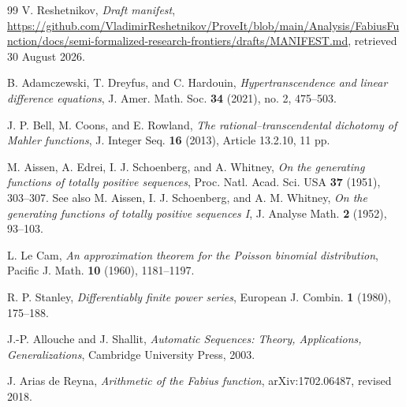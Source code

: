 \documentclass[11pt,oneside]{article}
\theoremstyle{definition}
\theoremstyle{remark}
\begin{document}
\begin{thebibliography}{99}
V. Reshetnikov,
\emph{Draft manifest},
\url{https://github.com/VladimirReshetnikov/ProveIt/blob/main/Analysis/FabiusFunction/docs/semi-formalized-research-frontiers/drafts/MANIFEST.md},
retrieved 30 August 2026.

B. Adamczewski, T. Dreyfus, and C. Hardouin,
\emph{Hypertranscendence and linear difference equations},
J. Amer. Math. Soc. \textbf{34} (2021), no. 2, 475--503.

J. P. Bell, M. Coons, and E. Rowland,
\emph{The rational--transcendental dichotomy of Mahler functions},
J. Integer Seq. \textbf{16} (2013), Article 13.2.10, 11 pp.

M. Aissen, A. Edrei, I. J. Schoenberg, and A. Whitney,
\emph{On the generating functions of totally positive sequences},
Proc. Natl. Acad. Sci. USA \textbf{37} (1951), 303--307.
See also M. Aissen, I. J. Schoenberg, and A. M. Whitney,
\emph{On the generating functions of totally positive sequences I},
J. Analyse Math. \textbf{2} (1952), 93--103.

L. Le Cam,
\emph{An approximation theorem for the Poisson binomial distribution},
Pacific J. Math. \textbf{10} (1960), 1181--1197.

R. P. Stanley,
\emph{Differentiably finite power series},
European J. Combin. \textbf{1} (1980), 175--188.

J.-P. Allouche and J. Shallit,
\emph{Automatic Sequences: Theory, Applications, Generalizations},
Cambridge University Press, 2003.

J. Arias de Reyna,
\emph{Arithmetic of the Fabius function},
arXiv:1702.06487, revised 2018.

\end{thebibliography}
\end{document}
